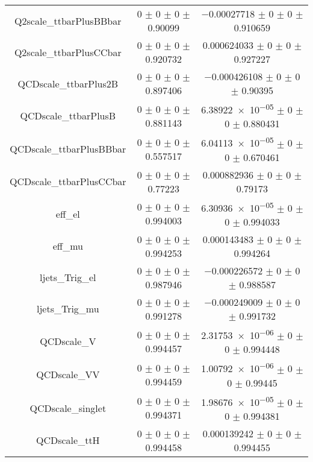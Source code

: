 \begin{table}
\begin{tabular}{ccc}
Q2scale\_ttbarPlusBBbar & \num{0} $\pm$ \num{0} $\pm$ \num{0} $\pm$ \num{0.90099} & \num{-0.00027718} $\pm$ \num{0} $\pm$ \num{0} $\pm$ \num{0.910659}\\
Q2scale\_ttbarPlusCCbar & \num{0} $\pm$ \num{0} $\pm$ \num{0} $\pm$ \num{0.920732} & \num{0.000624033} $\pm$ \num{0} $\pm$ \num{0} $\pm$ \num{0.927227}\\
QCDscale\_ttbarPlus2B & \num{0} $\pm$ \num{0} $\pm$ \num{0} $\pm$ \num{0.897406} & \num{-0.000426108} $\pm$ \num{0} $\pm$ \num{0} $\pm$ \num{0.90395}\\
QCDscale\_ttbarPlusB & \num{0} $\pm$ \num{0} $\pm$ \num{0} $\pm$ \num{0.881143} & \num{6.38922e-05} $\pm$ \num{0} $\pm$ \num{0} $\pm$ \num{0.880431}\\
QCDscale\_ttbarPlusBBbar & \num{0} $\pm$ \num{0} $\pm$ \num{0} $\pm$ \num{0.557517} & \num{6.04113e-05} $\pm$ \num{0} $\pm$ \num{0} $\pm$ \num{0.670461}\\
QCDscale\_ttbarPlusCCbar & \num{0} $\pm$ \num{0} $\pm$ \num{0} $\pm$ \num{0.77223} & \num{0.000882936} $\pm$ \num{0} $\pm$ \num{0} $\pm$ \num{0.79173}\\
eff\_el & \num{0} $\pm$ \num{0} $\pm$ \num{0} $\pm$ \num{0.994003} & \num{6.30936e-05} $\pm$ \num{0} $\pm$ \num{0} $\pm$ \num{0.994033}\\
eff\_mu & \num{0} $\pm$ \num{0} $\pm$ \num{0} $\pm$ \num{0.994253} & \num{0.000143483} $\pm$ \num{0} $\pm$ \num{0} $\pm$ \num{0.994264}\\
ljets\_Trig\_el & \num{0} $\pm$ \num{0} $\pm$ \num{0} $\pm$ \num{0.987946} & \num{-0.000226572} $\pm$ \num{0} $\pm$ \num{0} $\pm$ \num{0.988587}\\
ljets\_Trig\_mu & \num{0} $\pm$ \num{0} $\pm$ \num{0} $\pm$ \num{0.991278} & \num{-0.000249009} $\pm$ \num{0} $\pm$ \num{0} $\pm$ \num{0.991732}\\
QCDscale\_V & \num{0} $\pm$ \num{0} $\pm$ \num{0} $\pm$ \num{0.994457} & \num{2.31753e-06} $\pm$ \num{0} $\pm$ \num{0} $\pm$ \num{0.994448}\\
QCDscale\_VV & \num{0} $\pm$ \num{0} $\pm$ \num{0} $\pm$ \num{0.994459} & \num{1.00792e-06} $\pm$ \num{0} $\pm$ \num{0} $\pm$ \num{0.99445}\\
QCDscale\_singlet & \num{0} $\pm$ \num{0} $\pm$ \num{0} $\pm$ \num{0.994371} & \num{1.98676e-05} $\pm$ \num{0} $\pm$ \num{0} $\pm$ \num{0.994381}\\
QCDscale\_ttH & \num{0} $\pm$ \num{0} $\pm$ \num{0} $\pm$ \num{0.994458} & \num{0.000139242} $\pm$ \num{0} $\pm$ \num{0} $\pm$ \num{0.994455}\\

\end{tabular}
\end{table}
